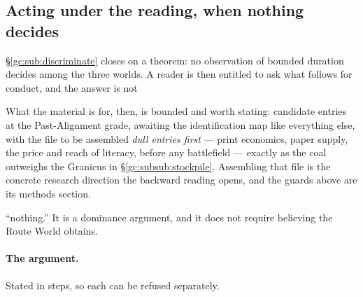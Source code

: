 \documentclass[11pt]{article}
\numberwithin{equation}{section}
\theoremstyle{plain}
\theoremstyle{definition}
\theoremstyle{remark}
\begin{document}
\subsection{Acting under the reading, when nothing decides}
\label{gc:sub:acting}

\S\ref{gc:sub:discriminate} closes on a theorem: no observation of
bounded duration decides among the three worlds. A reader is then
entitled to ask what follows for conduct, and the answer is not

What the material is for, then, is bounded and worth stating: candidate
entries at the Past-Alignment grade, awaiting the identification map
like everything else, with the file to be assembled \emph{dull entries
first} --- print economics, paper supply, the price and reach of
literacy, before any battlefield --- exactly as the coal outweighs the
Granicus in \S\ref{gc:subsub:stockpile}. Assembling that file is the
concrete research direction the backward reading opens, and the guards
above are its methods section.

``nothing.'' It is a dominance argument, and it does not require
believing the Route World obtains.

\paragraph{The argument.} Stated in steps, so each can be refused
separately.
\end{document}
